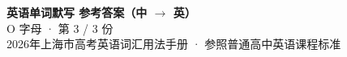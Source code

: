 \documentclass[10pt,a4paper]{article}
\begin{document}
\pagestyle{plain}

\begin{center}
{\LARGE\bfseries 英语单词默写 \quad 参考答案（中 $\to$ 英）}\\[0.22em]
{\large O 字母 · 第 3 / 3 份}\\[0.18em]
{\small 2026年上海市高考英语词汇用法手册 · 参照普通高中英语课程标准}
\end{center}

\vspace{0.2em}
\noindent{\color{rulegray}\rule{\textwidth}{0.8pt}}

\vspace{0.35em}

\vspace{0.25em}
\renewcommand{\arraystretch}{1.32}
\end{document}
